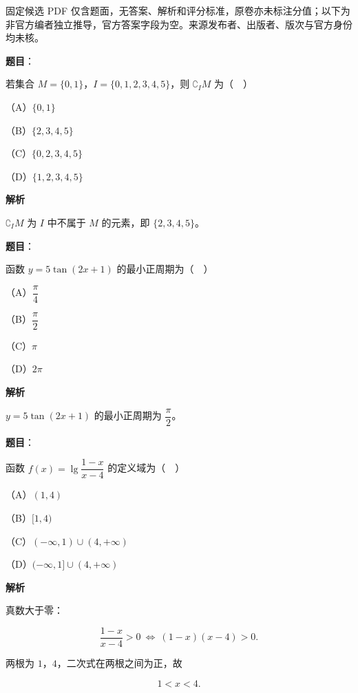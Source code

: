 

\begin{gktip}
固定候选 PDF 仅含题面，无答案、解析和评分标准，原卷亦未标注分值；以下为非官方编者独立推导，官方答案字段为空。来源发布者、出版者、版次与官方身份均未核。
\end{gktip}

\begin{answer}

\textbf{题目}：

若集合 $M=\{0,1\}$，$I=\{0,1,2,3,4,5\}$，则 $\complement_IM$ 为（　）

（A）$\{0,1\}$

（B）$\{2,3,4,5\}$

（C）$\{0,2,3,4,5\}$

（D）$\{1,2,3,4,5\}$

\textbf{解析}

$\complement_IM$ 为 $I$ 中不属于 $M$ 的元素，即 $\{2,3,4,5\}$。


\end{answer}
\begin{answer}

\textbf{题目}：

函数 $y=5\tan(2x+1)$ 的最小正周期为（　）

（A）$\dfrac{\pi}{4}$

（B）$\dfrac{\pi}{2}$

（C）$\pi$

（D）$2\pi$

\textbf{解析}

$y=5\tan(2x+1)$ 的最小正周期为 $\dfrac{\pi}{2}$。


\end{answer}
\begin{answer}

\textbf{题目}：

函数 $f(x)=\lg\dfrac{1-x}{x-4}$ 的定义域为（　）

（A）$(1,4)$

（B）$[1,4)$

（C）$(-\infty,1)\cup(4,+\infty)$

（D）$(-\infty,1]\cup(4,+\infty)$

\textbf{解析}

真数大于零：

\nopagebreak[4]
\[\frac{1-x}{x-4}>0\ \Leftrightarrow\ (1-x)(x-4)>0.\]

两根为 $1$，$4$，二次式在两根之间为正，故

\nopagebreak[4]
\[1<x<4.\]


\end{answer}
